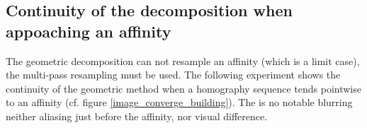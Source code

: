 


\subsection{Continuity of the decomposition when appoaching an affinity}

The geometric decomposition can not resample an affinity (which is a limit case), the multi-pass resampling must be used. The following experiment shows the continuity of the geometric method when a homography sequence tends pointwise to an affinity (cf. figure \ref{image_converge_building}). The is no notable blurring neither aliasing just before the affinity, nor visual difference.

